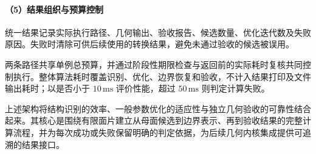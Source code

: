 \paragraph{（5）结果组织与预算控制}
统一结果记录实际执行路径、几何输出、验收报告、候选数量、优化迭代数及失败原因。失败时清除可供后续使用的转换结果，避免未通过验收的候选被误用。

两条路径共享单例总预算，并通过阶段性期限检查与返回前的实际耗时复核共同控制执行。整体算法耗时覆盖识别、优化、边界恢复和验收，不计入结果打印及文件输出耗时；以是否小于 $10\,\mathrm{ms}$ 评价性能，超过 $50\,\mathrm{ms}$ 则判定计算失败。

上述架构将结构识别的效率、一般参数优化的适应性与独立几何验收的可靠性结合起来。其核心是围绕有限面片建立从母面候选到边界表示、再到验收结果的完整计算流程，并为每次成功或失败保留明确的判定依据，为后续几何内核集成提供可追溯的结果接口。
